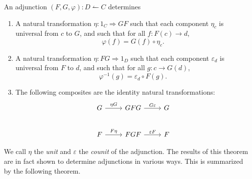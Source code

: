 \begin{theorem}\label{thm:4.1}
	An adjunction $(F,G,\varphi ) : D \leftharpoonup C$ determines
	\begin{enumerate}
		\item A natural transformation $\eta : 1_C \Rightarrow GF$ such that each component $\eta_c$ is universal from $c$ to $G$, and such that for all $f : F(c) \to d$,
			\[
				\varphi (f)=G(f)\circ \eta_c
			.\]
		\item A natural transformation $\eta : FG \Rightarrow 1_D$ such that each component $\varepsilon_d$ is universal from $F$ to $d$, and such that for all $g : c \to G(d)$,
			\[
				\varphi^{-1} (g)=\varepsilon _d\circ F(g)
			.\]
		\item The following composites are the identity natural transformations:
			\[\begin{tikzcd}[row sep = 2.5em, column sep = 2.5em]
			G\ar[" \eta G ", r]  & GFG\ar[" G\varepsilon  ", r]  & G \\
			F\ar[" F\eta  ", r]  & FGF\ar[" \varepsilon F ", r]  & F
			\end{tikzcd}\]
	\end{enumerate}
\end{theorem}

We call $\eta$ the \emph{unit} and $\varepsilon $ the \emph{counit} of the adjunction. The results of this theorem are in fact shown to determine adjunctions in various ways. This is summarized by the following theorem.

